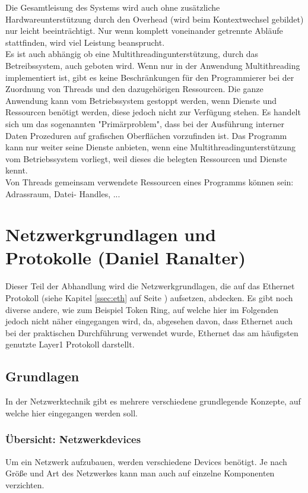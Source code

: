 \documentclass[12pt,a4paper]{report}
\begin{document}
\begin{onehalfspace}
Die Gesamtleisung des Systems wird auch ohne zusätzliche Hardwareunterstützung durch den Overhead (wird beim Kontextwechsel gebildet) nur leicht beeinträchtigt. Nur wenn komplett voneinander getrennte Abläufe stattfinden, wird viel Leistung beansprucht.\\

Es ist auch abhängig ob eine Multithreadingunterstützung, durch das Betreibssystem, auch geboten wird. Wenn nur in der Anwendung Multithreading implementiert ist, gibt es keine Beschränkungen für den Programmierer bei der Zuordnung von Threads und den dazugehörigen Ressourcen. Die ganze Anwendung kann vom Betriebssystem gestoppt werden, wenn Dienste und Ressourcen benötigt werden, diese jedoch nicht zur Verfügung stehen. Es handelt sich um das sogenannten "{}Primärproblem"{}, dass bei der Ausführung interner Daten Prozeduren auf grafischen Oberflächen vorzufinden ist. Das Programm kann nur weiter seine Dienste anbieten, wenn eine Multithreadingunterstützung vom Betriebssystem vorliegt, weil dieses die belegten Ressourcen und Dienste kennt.\\

Von Threads gemeinsam verwendete Ressourcen eines Programms können sein: Adrassraum, Datei- Handles, 
...\\

\newpage
{}
\chapter{Netzwerkgrundlagen und Protokolle (Daniel Ranalter)}
Dieser Teil der Abhandlung wird die Netzwerkgrundlagen, die auf das Ethernet Protokoll (siehe Kapitel \ref{ssec:eth} auf Seite \pageref{ssec:eth}) aufsetzen, abdecken. Es gibt noch diverse andere, wie zum Beispiel Token Ring, auf welche hier im Folgenden jedoch nicht näher eingegangen wird, da, abgesehen davon, dass Ethernet auch bei der praktischen Durchführung verwendet wurde, Ethernet das am häufigsten genutzte Layer1 Protokoll darstellt. 

\section{Grundlagen}
In der Netzwerktechnik gibt es mehrere verschiedene grundlegende Konzepte, auf welche hier eingegangen werden soll.

\subsection{Übersicht: Netzwerkdevices}
Um ein Netzwerk aufzubauen, werden verschiedene Devices benötigt. Je nach Größe und Art des Netzwerkes kann man auch auf einzelne Komponenten verzichten. 


\end{onehalfspace}
\end{document}
